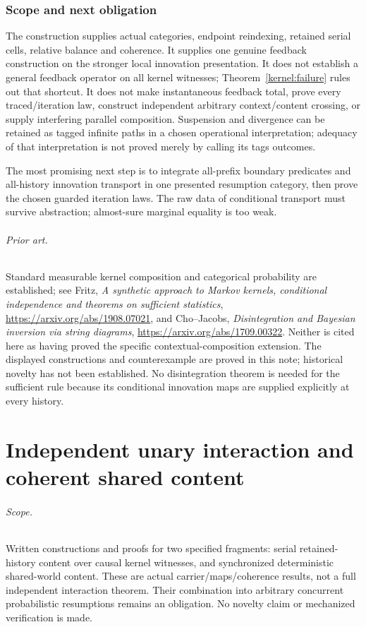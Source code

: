 \documentclass[11pt]{article}
\begin{document}
\section{Scope and next obligation}
The construction supplies actual categories, endpoint reindexing, retained serial cells, relative balance and coherence. It supplies one genuine feedback construction on the stronger local innovation presentation. It does not establish a general feedback operator on all kernel witnesses; Theorem~\ref{kernel:failure} rules out that shortcut. It does not make instantaneous feedback total, prove every traced/iteration law, construct independent arbitrary context/content crossing, or supply interfering parallel composition. Suspension and divergence can be retained as tagged infinite paths in a chosen operational interpretation; adequacy of that interpretation is not proved merely by calling its tags outcomes.

The most promising next step is to integrate all-prefix boundary predicates and all-history innovation transport in one presented resumption category, then prove the chosen guarded iteration laws. The raw data of conditional transport must survive abstraction; almost-sure marginal equality is too weak.

\paragraph{Prior art.} Standard measurable kernel composition and categorical probability are established; see Fritz, \emph{A synthetic approach to Markov kernels, conditional independence and theorems on sufficient statistics}, \url{https://arxiv.org/abs/1908.07021}, and Cho--Jacobs, \emph{Disintegration and Bayesian inversion via string diagrams}, \url{https://arxiv.org/abs/1709.00322}. Neither is cited here as having proved the specific contextual-composition extension. The displayed constructions and counterexample are proved in this note; historical novelty has not been established. No disintegration theorem is needed for the sufficient rule because its conditional innovation maps are supplied explicitly at every history.


\part{Independent unary interaction and coherent shared content}

\paragraph{Scope.} Written constructions and proofs for two specified fragments: serial retained-history content over causal kernel witnesses, and synchronized deterministic shared-world content. These are actual carrier/maps/coherence results, not a full independent interaction theorem. Their combination into arbitrary concurrent probabilistic resumptions remains an obligation. No novelty claim or mechanized verification is made.
\end{document}
